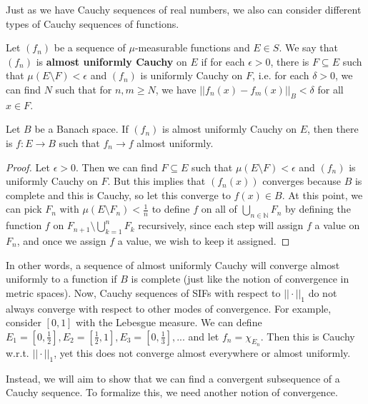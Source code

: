 	Just as we have Cauchy sequences of real numbers, we also can consider different types of Cauchy sequences of 
	functions.
	
	\begin{definition}
		Let $(f_n)$ be a sequence of $\mu$-measurable functions and $E\in S$. We say that $(f_n)$ is \textbf{almost 
		uniformly Cauchy} on $E$ if for each $\epsilon > 0$, there is $F\subseteq E$ such that $\mu(E\setminus F) < 
		\epsilon$ and $(f_n)$ is uniformly Cauchy on $F$, i.e. for each $\delta > 0$, we can find $N$ such that for 
		$n, m\geq N$, we have $||f_n(x) - f_m(x)||_B < \delta$ for all $x\in F$. 
	\end{definition}
	
	\begin{prop}
		Let $B$ be a Banach space. If $(f_n)$ is almost uniformly Cauchy on $E$, then there is $f : E\rightarrow B$ 
		such that $f_n\rightarrow f$ almost uniformly.
	\end{prop}
	
	\begin{proof}
		Let $\epsilon > 0$. Then we can find $F\subseteq E$ such that $\mu(E\setminus F) < \epsilon$ and $(f_n)$ 
		is uniformly Cauchy on $F$. But this implies that $(f_n(x))$ converges because $B$ is complete and this is 
		Cauchy, so let this converge to $f(x)\in B$. At this point, we can pick $F_n$ with $\mu(E\setminus F_n) < \frac{1}{n}$ 
		to define $f$ on all of $\bigcup_{n\in\mathbb N} F_n$ by defining the function $f$ on $F_{n + 1}\setminus \bigcup_{k 
		= 1}^nF_k$ recursively, since each step will assign $f$ a value on $F_n$, and once we assign $f$ a value, we wish 
		to keep it assigned.
	\end{proof}
	
	In other words, a sequence of almost uniformly Cauchy will converge almost uniformly to a function if $B$ is complete 
	(just like the notion of convergence in metric spaces). Now, Cauchy sequences of SIFs with respect to $||\cdot||_1$ do 
	not always converge with respect to other modes of convergence. For example, consider $[0, 1]$ with the Lebesgue 
	measure. We can define $E_1 = [0, \frac{1}{2}], E_2 = [\frac{1}{2}, 1], E_3 = [0, \frac{1}{3}], ...$ and let 
	$f_n = \chi_{E_n}$. Then this is Cauchy w.r.t. $||\cdot||_1$, yet this does not converge almost everywhere or almost 
	uniformly.
	
	Instead, we will aim to show that we can find a convergent subsequence of a Cauchy sequence. To formalize this, we 
	need another notion of convergence. 
	

